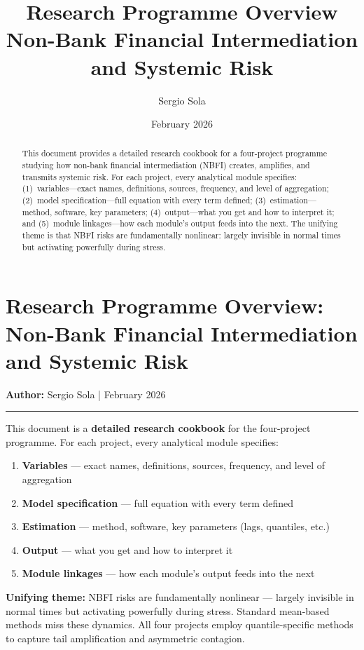 \documentclass[11pt,a4paper]{article}
\title{\LARGE\textbf{Research Programme Overview}\\[0.5em]
       \Large Non-Bank Financial Intermediation and Systemic Risk}
\author{Sergio Sola}
\date{February 2026}
\begin{document}
\maketitle
\thispagestyle{empty}

\begin{abstract}
\noindent This document provides a detailed research cookbook for a four-project
programme studying how non-bank financial intermediation (NBFI) creates, amplifies,
and transmits systemic risk. For each project, every analytical module specifies:
(1)~variables---exact names, definitions, sources, frequency, and level of aggregation;
(2)~model specification---full equation with every term defined;
(3)~estimation---method, software, key parameters;
(4)~output---what you get and how to interpret it; and
(5)~module linkages---how each module's output feeds into the next.
The unifying theme is that NBFI risks are fundamentally nonlinear: largely invisible
in normal times but activating powerfully during stress.
\end{abstract}

\tableofcontents
\newpage


\section{Research Programme Overview: Non-Bank Financial Intermediation and Systemic Risk}

\textbf{Author:} Sergio Sola | February 2026


\bigskip\noindent\rule{\textwidth}{0.4pt}\bigskip

This document is a \textbf{detailed research cookbook} for the four-project programme. For each project, every analytical module specifies:

\begin{enumerate}
\item \textbf{Variables} --- exact names, definitions, sources, frequency, and level of aggregation
\item \textbf{Model specification} --- full equation with every term defined
\item \textbf{Estimation} --- method, software, key parameters (lags, quantiles, etc.)
\item \textbf{Output} --- what you get and how to interpret it
\item \textbf{Module linkages} --- how each module's output feeds into the next

\end{enumerate}
\textbf{Unifying theme:} NBFI risks are fundamentally nonlinear --- largely invisible in normal
times but activating powerfully during stress. Standard mean-based methods miss these
dynamics. All four projects employ quantile-specific methods to capture tail amplification
and asymmetric contagion.
\end{document}
